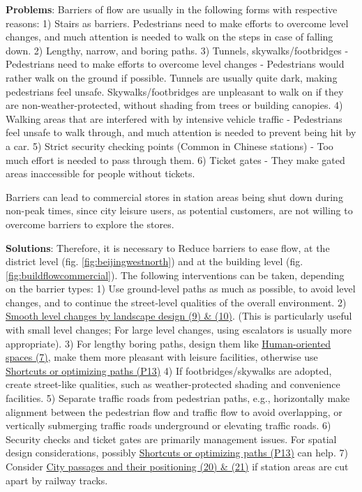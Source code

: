 \documentclass{article}
\begin{document}
\textbf{Problems}: Barriers of flow are usually in the following forms with respective reasons: 
1) Stairs as barriers. Pedestrians need to make efforts to overcome level changes, and much attention is needed to walk on the steps in case of falling down.
2) Lengthy, narrow, and boring paths.
3) Tunnels, skywalks/footbridges - Pedestrians need to make efforts to overcome level changes - Pedestrians would rather walk on the ground if possible. Tunnels are usually quite dark, making pedestrians feel unsafe. Skywalks/footbridges are unpleasant to walk on if they are non-weather-protected, without shading from trees or building canopies.
4) Walking areas that are interfered with by intensive vehicle traffic - Pedestrians feel unsafe to walk through, and much attention is needed to prevent being hit by a car.
5) Strict security checking points (Common in Chinese stations) - Too much effort is needed to pass through them. 
6) Ticket gates - They make gated areas inaccessible for people without tickets.

Barriers can lead to commercial stores in station areas being shut down during non-peak times, since city leisure users, as potential customers, are not willing to overcome barriers to explore the stores.


\textbf{Solutions}: Therefore, it is necessary to Reduce barriers to ease flow, at the district level (fig. \ref{fig:beijingwestnorth}) and at the building level (fig. \ref{fig:buildflowcommercial}). The following interventions can be taken, depending on the barrier types:
1) Use ground-level paths as much as possible, to avoid level changes, and to continue the street-level qualities of the overall environment.
2) \hyperref[(9 10) Smooth level changes by landscape design]{Smooth level changes by landscape design (9) \& (10)}. (This is particularly useful with small level changes; For large level changes, using escalators is usually more appropriate).
3) For lengthy boring paths, design them like \hyperref[(7) Human-oriented spaces]{Human-oriented spaces (7)}, make them more pleasant with leisure facilities, otherwise use \hyperref[(P13) Shortcuts or optimizing paths]{Shortcuts or optimizing paths (P13)}
4) If footbridges/skywalks are adopted, create street-like qualities, such as weather-protected shading and convenience facilities.
5) Separate traffic roads from pedestrian paths, e.g., horizontally make alignment between the pedestrian flow and traffic flow to avoid overlapping, or vertically submerging traffic roads underground or elevating traffic roads.
6) Security checks and ticket gates are primarily management issues. For spatial design considerations, possibly \hyperref[(P13) Shortcuts or optimizing paths]{Shortcuts or optimizing paths (P13)} can help. 
7) Consider \hyperref[(20 21) City passages and their positioning]{City passages and their positioning (20) \& (21)} if station areas are cut apart by railway tracks.
\end{document}
